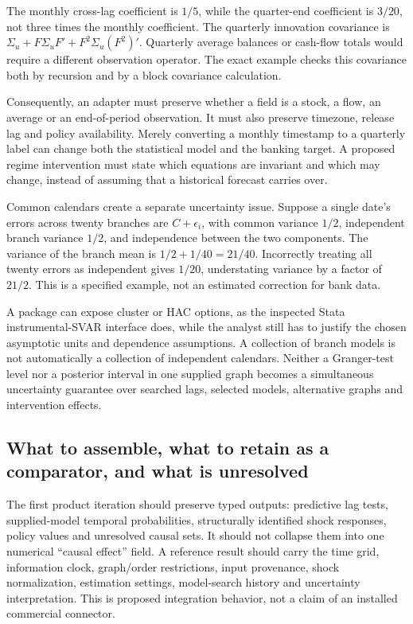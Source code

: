 The monthly cross-lag coefficient is \(1/5\), while the quarter-end
coefficient is \(3/20\), not three times the monthly coefficient. The
quarterly innovation covariance is
\(\Sigma_u+F\Sigma_uF'+F^2\Sigma_u(F^2)'\). Quarterly average balances
or cash-flow totals would require a different observation operator. The
exact example checks this covariance both by recursion and by a block
covariance calculation.\citep{exec13_ct_examples}

Consequently, an adapter must preserve whether a field is a stock, a
flow, an average or an end-of-period observation. It must also preserve
timezone, release lag and policy availability. Merely converting a
monthly timestamp to a quarterly label can change both the statistical
model and the banking target. A proposed regime intervention must state
which equations are invariant and which may change, instead of assuming
that a historical forecast carries over.

Common calendars create a separate uncertainty issue. Suppose a single
date's errors across twenty branches are \(C+\epsilon_i\), with common
variance \(1/2\), independent branch variance \(1/2\), and independence
between the two components. The variance of the branch mean is
\(1/2+1/40=21/40\). Incorrectly treating all twenty errors as
independent gives \(1/20\), understating variance by a factor of
\(21/2\). This is a specified example, not an estimated correction for
bank data. \citep{exec13_ct_examples}

A package can expose cluster or HAC options, as the inspected Stata
instrumental-SVAR interface does, while the analyst still has to justify
the chosen asymptotic units and dependence assumptions. A collection of
branch models is not automatically a collection of independent
calendars. Neither a Granger-test level nor a posterior interval in one
supplied graph becomes a simultaneous uncertainty guarantee over
searched lags, selected models, alternative graphs and intervention
effects.

\hypertarget{what-to-assemble-what-to-retain-as-a-comparator-and-what-is-unresolved}{%
\subsection{What to assemble, what to retain as a comparator, and what
is
unresolved}\label{what-to-assemble-what-to-retain-as-a-comparator-and-what-is-unresolved}}

The first product iteration should preserve typed outputs: predictive
lag tests, supplied-model temporal probabilities, structurally
identified shock responses, policy values and unresolved causal sets. It
should not collapse them into one numerical ``causal effect'' field. A
reference result should carry the time grid, information clock,
graph/order restrictions, input provenance, shock normalization,
estimation settings, model-search history and uncertainty
interpretation. This is proposed integration behavior, not a claim of an
installed commercial connector.

